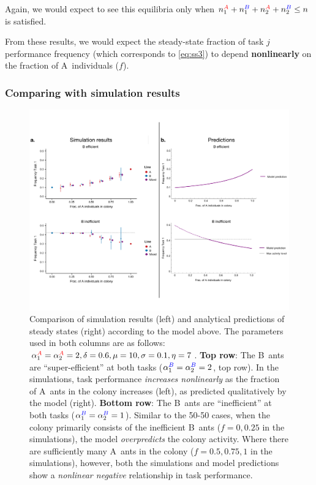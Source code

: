 \documentclass[10pt]{article}
\theoremstyle{remark}
\newcommand{\A}{{\color{red}A}}
\newcommand{\B}{{\color{blue}B}}
\begin{document}
Again, we would expect to see this equilibria only when $n_1^{\A} + n_1^{\B} + n_2^{\A}+ n_2^{\B} \leq n$ is satisfied.

From these results, we would expect the steady-state fraction of task $j$ performance frequency (which corresponds to \eqref{eq:ss3}) to depend \textbf{nonlinearly} on the fraction of \A\ individuals ($f$). 

\subsubsection{Comparing with simulation results}
\begin{figure}[H]
    \centering
    \includegraphics[trim={0 1in 0 0.75in}, clip, width=0.9\linewidth]{mixes_comparison.pdf}
    \caption{Comparison of simulation results (left) and analytical predictions of steady states (right) according to the model above. The parameters used in both columns are as follows: $\alpha_1^{\A} = \alpha_2^{\A} = 2, \delta= 0.6, \mu=10, \sigma = 0.1, \eta = 7$. 
    \textbf{Top row}: The \B\ ants are ``super-efficient'' at both tasks ($\alpha_1^{\B} = \alpha_2^{\B} = 2$, top row). In the simulations, task performance \textit{increases nonlinearly} as the fraction of \A\ ants in the colony increases (left), as predicted qualitatively by the model (right).
    \textbf{Bottom row}: The \B\ ants are ``inefficient'' at both tasks ($\alpha_1^{\B} = \alpha_2^{\B} = 1$). 
    Similar to the 50-50 cases, when the colony primarily consists of the inefficient \B\ ants ($f = 0, 0.25$ in the simulations), the model \textit{overpredicts} the colony activity.
    Where there are sufficiently many \A\ ants in the colony ($f = 0.5, 0.75, 1$ in the simulations), however, both the simulations and model predictions show a \textit{nonlinear negative} relationship in task performance.}
    \label{fig:mixes_comp}
\end{figure}
\end{document}
